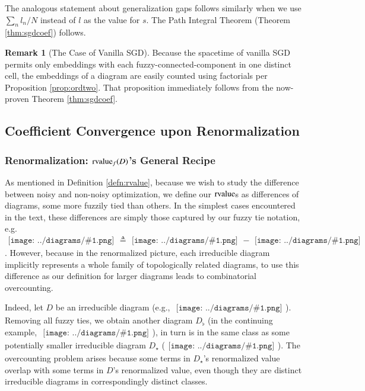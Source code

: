 \documentclass{article}
\theoremstyle{plain}
\theoremstyle{definition}
\newtheorem{rmk}{Remark}
\newcommand{\rvalue}{\text{\textnormal{rvalue}}}
\newcommand{\sdia}[1]{\begin{gathered}\texttt{[image: ../diagrams/\#1.png]}\end{gathered}}
\begin{document}
            The analogous statement about generalization gaps follows similarly
            when we use $\sum_n l_n/N$ instead of $l$ as the value for $s$. 
            The Path Integral Theorem (Theorem \ref{thm:sgdcoef}) follows.

            \begin{rmk}[The Case of Vanilla SGD]
                Because the spacetime of vanilla SGD permits only embeddings
                with each fuzzy-connected-component in one distinct cell, the
                embeddings of a diagram are easily counted using factorials
                per Proposition \ref{prop:ordtwo}.  That proposition immediately
                follows from the now-proven Theorem \ref{thm:sgdcoef}.
            \end{rmk}

    \subsection{Coefficient Convergence upon Renormalization}
        \subsubsection*{Renormalization: $\rvalue_f(D)$'s General Recipe} \label{subsubsect:mobius}
            As mentioned in Definition \ref{defn:rvalue}, because we wish to
            study the difference between noisy and non-noisy optimization, we
            define our $\rvalue$s as differences of diagrams, some
            more fuzzily tied than others.  In the simplest cases 
            encountered in the text, these differences are simply those captured
            by our fuzzy tie notation, e.g.
            $
                \sdia{c(01-2-3)(02-12-23)}
                \triangleq
                \sdia{(01-2-3)(02-12-23)}
                -
                \sdia{(0-1-2-3)(02-12-23)}
            $.
            However, because in the renormalized picture, each irreducible
            diagram implicitly represents a whole family of topologically
            related diagrams, to use this difference as our definition for
            larger diagrams leads to combinatorial overcounting.

            Indeed, let $D$ be an irreducible diagram
            (e.g., $\sdia{(012-3)(01-12-23)}$).
            Removing all fuzzy ties, we obtain another diagram $D_\flat$
            (in the continuing example, $\sdia{(0-1-2-3)(01-12-23)}$),
            in turn is in the same class as some potentially smaller
            irreducible diagram $D_\star$
            ($\sdia{(0-1)(01)}$).
            The overcounting problem arises because some terms in $D_\star$'s
            renormalized value overlap with some terms in $D$'s renormalized
            value, even though they are distinct irreducible diagrams in
            correspondingly distinct classes.
\end{document}
